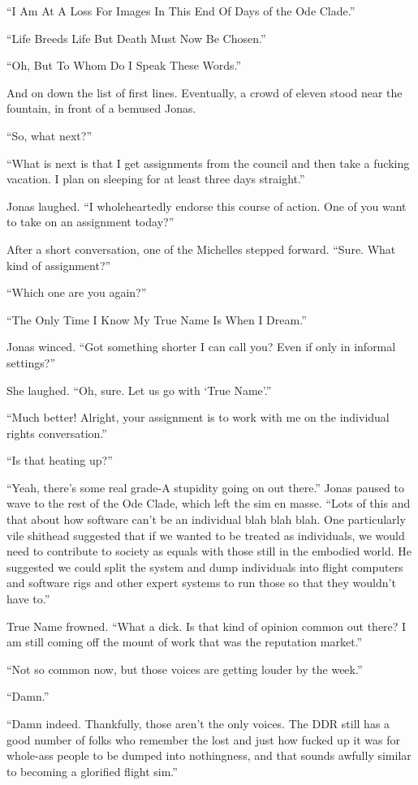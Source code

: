 ``I Am At A Loss For Images In This End Of Days of the Ode Clade.''

``Life Breeds Life But Death Must Now Be Chosen.''

``Oh, But To Whom Do I Speak These Words.''

And on down the list of first lines. Eventually, a crowd of eleven stood near the fountain, in front of a bemused Jonas.

``So, what next?''

``What is next is that I get assignments from the council and then take a fucking vacation. I plan on sleeping for at least three days straight.''

Jonas laughed. ``I wholeheartedly endorse this course of action. One of you want to take on an assignment today?''

After a short conversation, one of the Michelles stepped forward. ``Sure. What kind of assignment?''

``Which one are you again?''

``The Only Time I Know My True Name Is When I Dream.''

Jonas winced. ``Got something shorter I can call you? Even if only in informal settings?''

She laughed. ``Oh, sure. Let us go with `True Name'.''

``Much better! Alright, your assignment is to work with me on the individual rights conversation.''

``Is that heating up?''

``Yeah, there's some real grade-A stupidity going on out there.'' Jonas paused to wave to the rest of the Ode Clade, which left the sim en masse. ``Lots of this and that about how software can't be an individual blah blah blah. One particularly vile shithead suggested that if we wanted to be treated as individuals, we would need to contribute to society as equals with those still in the embodied world. He suggested we could split the system and dump individuals into flight computers and software rigs and other expert systems to run those so that they wouldn't have to.''

True Name frowned. ``What a dick. Is that kind of opinion common out there? I am still coming off the mount of work that was the reputation market.''

``Not so common now, but those voices are getting louder by the week.''

``Damn.''

``Damn indeed. Thankfully, those aren't the only voices. The DDR still has a good number of folks who remember the lost and just how fucked up it was for whole-ass people to be dumped into nothingness, and that sounds awfully similar to becoming a glorified flight sim.''

